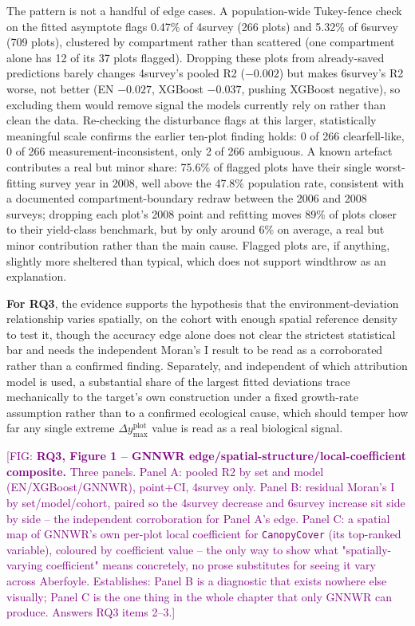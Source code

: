 \documentclass[11pt,a4paper]{report}
\newcommand{\fig}[1]{\textcolor{purple}{[FIG: #1]}}
\begin{document}
The pattern is not a handful of edge cases. A population-wide Tukey-fence check on the
fitted asymptote flags 0.47\% of 4survey (266 plots) and 5.32\% of 6survey (709
plots), clustered by compartment rather than scattered (one compartment alone has 12
of its 37 plots flagged). Dropping these plots from already-saved predictions barely
changes 4survey's pooled R2 ($-0.002$) but makes 6survey's R2 worse, not better
(EN $-0.027$, XGBoost $-0.037$, pushing XGBoost negative), so excluding them would
remove signal the models currently rely on rather than clean the data. Re-checking
the disturbance flags at this larger, statistically meaningful scale confirms the
earlier ten-plot finding holds: 0 of 266 clearfell-like, 0 of 266
measurement-inconsistent, only 2 of 266 ambiguous. A known artefact contributes a real
but minor share: 75.6\% of flagged plots have their single worst-fitting survey year
in 2008, well above the 47.8\% population rate, consistent with a documented
compartment-boundary redraw between the 2006 and 2008 surveys; dropping each plot's
2008 point and refitting moves 89\% of plots closer to their yield-class benchmark,
but by only around 6\% on average, a real but minor contribution rather than the main
cause. Flagged plots are, if anything, slightly more sheltered than typical, which
does not support windthrow as an explanation.

\textbf{For RQ3}, the evidence supports the hypothesis that the environment-deviation
relationship varies spatially, on the cohort with enough spatial reference density to
test it, though the accuracy edge alone does not clear the strictest statistical bar
and needs the independent Moran's I result to be read as a corroborated rather than a
confirmed finding. Separately, and independent of which attribution model is used, a
substantial share of the largest fitted deviations trace mechanically to the
target's own construction under a fixed growth-rate assumption rather than to a
confirmed ecological cause, which should temper how far any single extreme
\(\Delta y_{\max}^{\text{plot}}\) value is read as a real biological signal.

\fig{\textbf{RQ3, Figure 1 -- GNNWR edge/spatial-structure/local-coefficient
composite.} Three panels. Panel A: pooled R2 by set and model (EN/XGBoost/GNNWR),
point+CI, 4survey only. Panel B: residual Moran's I by set/model/cohort, paired so the
4survey decrease and 6survey increase sit side by side -- the independent
corroboration for Panel A's edge. Panel C: a spatial map of GNNWR's own per-plot local
coefficient for \texttt{CanopyCover} (its top-ranked variable), coloured by
coefficient value -- the only way to show what "spatially-varying coefficient" means
concretely, no prose substitutes for seeing it vary across Aberfoyle. Establishes:
Panel B is a diagnostic that exists nowhere else visually; Panel C is the one thing in
the whole chapter that only GNNWR can produce. Answers RQ3 items 2--3.}
\end{document}
